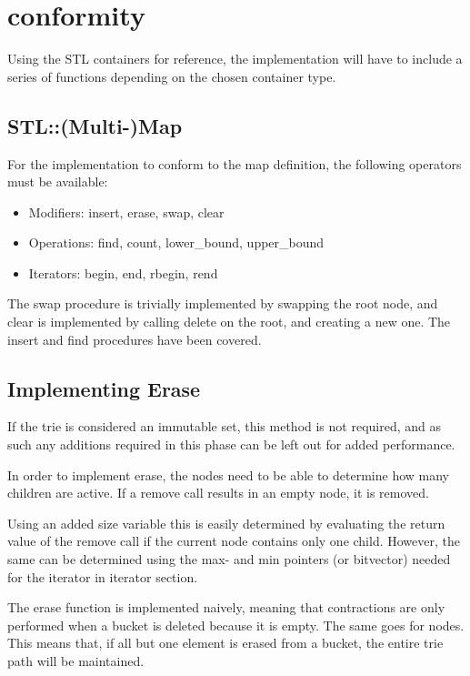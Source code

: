 
\section{\STL  conformity}
Using the STL containers for reference, the implementation will have to include
a series of functions depending on the chosen container type.

\subsection{STL::(Multi-)Map}
For the implementation to conform to the map definition, the following operators
must be available:
\begin{itemize}
    \item Modifiers: {\keyword insert}, {\keyword erase}, {\keyword swap},
        {\keyword clear}
    \item Operations: {\keyword find}, {\keyword count}, {\keyword lower\_bound},
        {\keyword upper\_bound}
    \item Iterators: {\keyword begin}, {\keyword end}, {\keyword rbegin},
        {\keyword rend}
\end{itemize}
The {\keyword swap} procedure is trivially implemented by swapping the root
node, and {\keyword clear} is implemented by calling {\keyword delete} on the
root, and creating a new one. The {\keyword insert} and {\keyword find}
procedures have been covered.

\subsection{Implementing Erase}
If the trie is considered an immutable set, this method is not required, and as such
any additions required in this phase can be left out for added performance.

In order to implement {\keyword erase}, the nodes need to be able to determine how many
children are active. If a remove call results in an empty node, it is removed.

Using an added {\keyword size} variable this is easily determined by evaluating the
return value of the remove call if the current node contains only one child.
However, the same can be determined using the {\keyword max}- and {\keyword
min} pointers (or bitvector) needed for the {\keyword iterator} in iterator
section.

The {\keyword erase} function is implemented naively, meaning that contractions
are only performed when a bucket is deleted because it is empty. The same goes
for nodes. This means that, if all but one element is erased from a bucket,
the entire trie path will be maintained.

